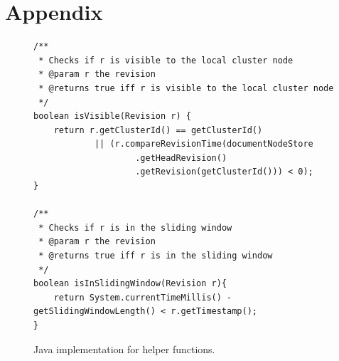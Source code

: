 \documentclass[abstracton,12pt]{scrreprt}
\begin{document}



\chapter{Appendix}

\begin{figure}[h]
    \begin{framed}
        \begin{scriptsize}
            \begin{verbatim}
/**
 * Checks if r is visible to the local cluster node
 * @param r the revision
 * @returns true iff r is visible to the local cluster node
 */
boolean isVisible(Revision r) {
    return r.getClusterId() == getClusterId()
            || (r.compareRevisionTime(documentNodeStore
                    .getHeadRevision()
                    .getRevision(getClusterId())) < 0);
}

/**
 * Checks if r is in the sliding window
 * @param r the revision
 * @returns true iff r is in the sliding window
 */
boolean isInSlidingWindow(Revision r){
    return System.currentTimeMillis() - getSlidingWindowLength() < r.getTimestamp();
}
            \end{verbatim}
        \end{scriptsize}
    \end{framed}
    \caption{Java implementation for helper functions.}
    \label{algo:helper_functions}
\end{figure}
\end{document}
